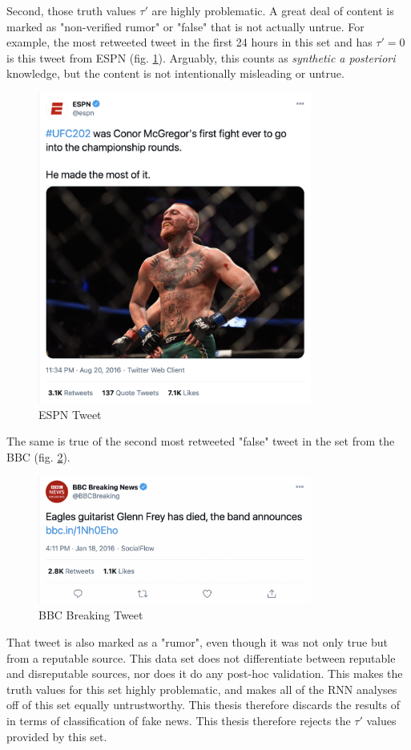 \documentclass[NETN,manuscript]{stjour-new}
\begin{document}
Second, those truth values $\tau'$ are highly problematic. A great deal of content is marked as "non-verified rumor" or "false" that is not actually untrue. For example, the most retweeted tweet in the first 24 hours in this set and has $\tau' = 0$ is this tweet from ESPN (fig. \ref{fig:ESPN Tweet, April 20, 2016}). Arguably, this counts as \textit{synthetic a posteriori} knowledge, but the content is not intentionally misleading or untrue. 
 \begin{figure}[h!]
    \centering
    \includegraphics[width=9cm]{espn Mcgregor tweet.png}
    \caption{ESPN Tweet}
    \label{fig:ESPN Tweet, April 20, 2016}
\end{figure}

The same is true of the second most retweeted "false" tweet in the set from the BBC (fig. \ref{fig:BBC Breaking Tweet, Jan 18, 2016}).
\begin{figure}[h!]
    \centering
    \includegraphics[width=9cm]{BBC Eagles.png}
    \caption{BBC Breaking Tweet}
    \label{fig:BBC Breaking Tweet, Jan 18, 2016}
\end{figure}
That tweet is also marked as a "rumor", even though it was not only true but from a reputable source. This data set does not differentiate between reputable and disreputable sources, nor does it do any post-hoc validation. This makes the truth values for this set highly problematic, and makes all of the RNN analyses off of this set equally untrustworthy. This thesis therefore discards the results of \citep{liu2018early,ma2017detect,ma2016detecting,khoo2020interpretable,liu2019early,huang2019deep} in terms of classification of fake news. This thesis therefore rejects the $\tau'$ values provided by this set.
\end{document}

